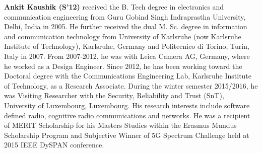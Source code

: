 \documentclass[journal, twocolumn]{IEEEtran}
\begin{document}
\begin{IEEEbiography}
{\textbf{Ankit Kaushik (S'12)}} received the B. Tech degree in electronics and communication engineering from Guru Gobind Singh Indraprastha University, Delhi, India in 2005. He further received the dual M. Sc. degree in information and communication technology from University of Karlsruhe (now Karlsruhe Institute of Technology), Karlsruhe, Germany and Politecnico di Torino, Turin, Italy in 2007. From 2007-2012, he was with Leica Camera AG, Germany, where he worked as a Design Engineer. Since 2012, he has been working toward the Doctoral degree with the Communications Engineering Lab, Karlsruhe Institute of Technology, as a Research Associate. During the winter semester 2015/2016, he was Visiting Researcher with the Security, Reliability and Trust (SnT), University of Luxembourg, Luxembourg. His research interests include software defined radio, cognitive radio communications and networks. He was a recipient of MERIT Scholarship for his Masters Studies within the Erasmus Mundus Scholarship Program and Subjective Winner of 5G Spectrum Challenge held at 2015 IEEE DySPAN conference. 
\end{IEEEbiography}
\end{document}

